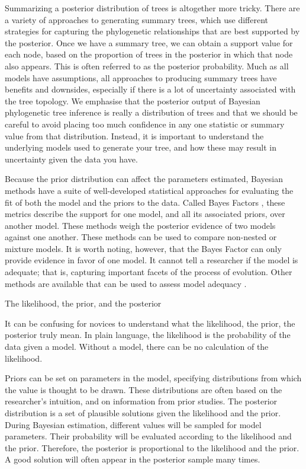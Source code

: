 \documentclass[11pt]{article}
\begin{document}
Summarizing a posterior distribution of trees is altogether more tricky.
There are a variety of approaches to generating summary trees, which use different strategies for capturing the phylogenetic relationships that are best supported by the posterior.
Once we have a summary tree, we can obtain a  support value for each node, based on the proportion of trees in the posterior in which that node also appears. 
This is often referred to as the posterior probability.
Much as all models have assumptions, all approaches to producing summary trees have benefits and downsides, especially if there is a lot of uncertainty associated with the tree topology.
We emphasise that the posterior output of Bayesian phylogenetic tree inference is really a distribution of trees and that we should be careful to avoid placing too much confidence in any one statistic or summary value from that distribution.
Instead, it is important to understand the underlying models used to generate your tree, and how these may result in uncertainty given the data you have.

Because the prior distribution can affect the parameters estimated, Bayesian methods have a suite of well-developed statistical approaches for evaluating the fit of both the model and the priors to the data.
Called Bayes Factors \cite{Xie2011}, these metrics describe the support for one model, and all its associated priors, over another model. 
These methods weigh the posterior evidence of two models against one another. 
These methods can be used to compare non-nested or mixture models.
It is worth noting, however, that the Bayes Factor can only provide evidence in favor of one model.
It cannot tell a researcher if the model is adequate; that is, capturing important facets of the process of evolution.
Other methods are available that can be used to assess model adequacy \cite{Brown2009, Brown2014}.


\clearpage
\begin{boxedtext}{The likelihood, the prior, and the posterior}

It can be confusing for novices to understand what the likelihood, the prior, the posterior truly mean.
In plain language, the likelihood is the probability of the data given a model.
Without a model, there can be no calculation of the likelihood.

Priors can be set on parameters in the model, specifying distributions from which the value is thought to be drawn.
These distributions are often based on the researcher's intuition, and on information from prior studies.
The posterior distribution is a set of plausible solutions given the likelihood and the prior.
During Bayesian estimation, different values will be sampled for model parameters.
Their probability will be evaluated according to the likelihood and the prior.
Therefore, the posterior is proportional to the likelihood and the prior.
A good solution will often appear in the posterior sample many times.

\end{boxedtext}
\end{document}
